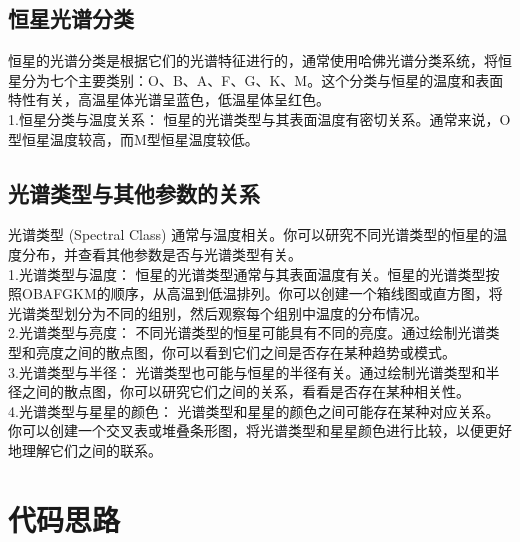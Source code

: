 \documentclass[12pt, a4paper, oneside]{article}
\begin{document}
\begin{spacing}{2.0}
\subsection{恒星光谱分类} 
恒星的光谱分类是根据它们的光谱特征进行的，通常使用哈佛光谱分类系统，将恒星分为七个主要类别：O、B、A、F、G、K、M。这个分类与恒星的温度和表面特性有关，高温星体光谱呈蓝色，低温星体呈红色。\\
1.恒星分类与温度关系： 恒星的光谱类型与其表面温度有密切关系。通常来说，O型恒星温度较高，而M型恒星温度较低。
\subsection{光谱类型与其他参数的关系} 
光谱类型 (Spectral Class) 通常与温度相关。你可以研究不同光谱类型的恒星的温度分布，并查看其他参数是否与光谱类型有关。\\
1.光谱类型与温度： 恒星的光谱类型通常与其表面温度有关。恒星的光谱类型按照OBAFGKM的顺序，从高温到低温排列。你可以创建一个箱线图或直方图，将光谱类型划分为不同的组别，然后观察每个组别中温度的分布情况。\\
2.光谱类型与亮度： 不同光谱类型的恒星可能具有不同的亮度。通过绘制光谱类型和亮度之间的散点图，你可以看到它们之间是否存在某种趋势或模式。\\
3.光谱类型与半径： 光谱类型也可能与恒星的半径有关。通过绘制光谱类型和半径之间的散点图，你可以研究它们之间的关系，看看是否存在某种相关性。\\
4.光谱类型与星星的颜色： 光谱类型和星星的颜色之间可能存在某种对应关系。你可以创建一个交叉表或堆叠条形图，将光谱类型和星星颜色进行比较，以便更好地理解它们之间的联系。

\section{代码思路}

\end{spacing}
\end{document}

